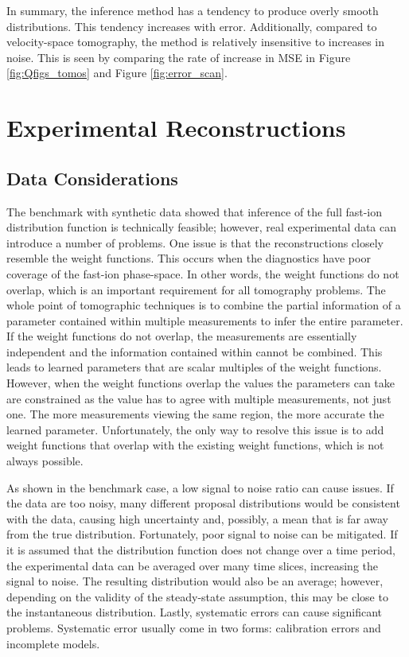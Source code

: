 In summary, the inference method has a tendency to produce overly smooth distributions. This tendency increases with error. Additionally, compared to velocity-space tomography, the method is relatively insensitive to increases in noise. This is seen by comparing the rate of increase in MSE in Figure \ref{fig:Qfigs_tomos} and Figure \ref{fig:error_scan}.  

\section{Experimental Reconstructions}\label{sec:experiment}
\subsection{Data Considerations}
The benchmark with synthetic data showed that inference of the full fast-ion distribution function is technically feasible; however, real experimental data can introduce a number of problems.
One issue is that the reconstructions closely resemble the weight functions.
This occurs when the diagnostics have poor coverage of the fast-ion phase-space.
In other words, the weight functions do not overlap, which is an important requirement for all tomography problems.
The whole point of tomographic techniques is to combine the partial information of a parameter contained within multiple measurements to infer the entire parameter. 
If the weight functions do not overlap, the measurements are essentially independent and the information contained within cannot be combined. This leads to learned parameters that are scalar multiples of the weight functions. However, when the weight functions overlap the values the parameters can take are constrained as the value has to agree with multiple measurements, not just one. The more measurements viewing the same region, the more accurate the learned parameter. 
Unfortunately, the only way to resolve this issue is to add weight functions that overlap with the existing weight functions, which is not always possible.

As shown in the benchmark case, a low signal to noise ratio can cause issues. 
If the data are too noisy, many different proposal distributions would be consistent with the data, causing high uncertainty and, possibly, a mean that is far away from the true distribution.
Fortunately, poor signal to noise can be mitigated. If it is assumed that the distribution function does not change over a time period, the experimental data can be averaged over many time slices, increasing the signal to noise. The resulting distribution would also be an average; however, depending on the validity of the steady-state assumption, this may be close to the instantaneous distribution.
Lastly, systematic errors can cause significant problems.
Systematic error usually come in two forms: calibration errors and incomplete models.

